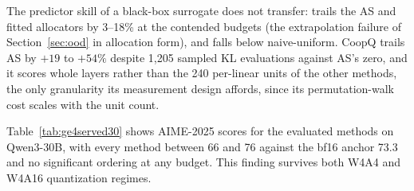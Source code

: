 The predictor skill of a black-box surrogate does not transfer:  trails the AS and
fitted allocators by 3--18\% at the contended budgets (the extrapolation failure of
Section~\ref{sec:ood} in allocation form), and  falls below naive-uniform.
CoopQ trails AS by $+19$ to $+54\%$
despite 1{,}205 sampled KL evaluations against AS's zero, and it scores whole layers rather than the
240 per-linear units of the other methods, the only granularity its measurement design affords, since
its permutation-walk cost scales with the unit count.

Table~\ref{tab:ge4served30} shows AIME-2025 scores for the evaluated methods on Qwen3-30B,
with every method between 66 and 76 against the bf16 anchor 73.3 and no significant ordering at any
budget. This finding survives both W4A4 and W4A16 quantization regimes.




